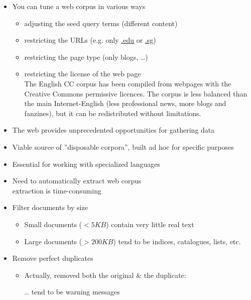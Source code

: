 \documentclass[a4paper,landscape,headrule,footrule,xetex]{foils}
\begin{document}

\begin{itemize}
\item You can tune a web corpus in various ways
  \begin{itemize}
  \item adjusting the seed query terms (different content)
  \item restricting the URLs (e.g. only \url{.edu} or \url{.sg})
  \item restricting the page type (only blogs, \ldots)
  \item restricting the license of the web page \\ The English CC
    corpus has been compiled from webpages with the Creative Commons
    permissive licences. The corpus is less balanced than the main
    Internet-English (less professional news, more blogs and
    fanzines), but it can be redistributed without limitations.

  \end{itemize}
\end{itemize}




 \begin{itemize}
  \item The web provides unprecedented opportunities for gathering data
  \item Viable source of ''disposable corpora'', built ad hoc for specific purposes
  \item Essential for working with specialized languages
  \item Need to automatically extract web corpus 
    \\ extraction is time-consuming
\end{itemize}


\begin{itemize}
\item Filter documents by size
  \begin{itemize}
  \item Small documents ($<5KB$) contain very little real text
  \item Large documents ($>200KB$) tend to be indices, catalogues, lists, etc.
  \end{itemize}
\item Remove perfect duplicates
  \begin{itemize}
  \item Actually, removed both the original \& the duplicate:
  \item[\ldots] tend to be warning messages 
  \end{itemize}
\end{itemize}
\end{document}

